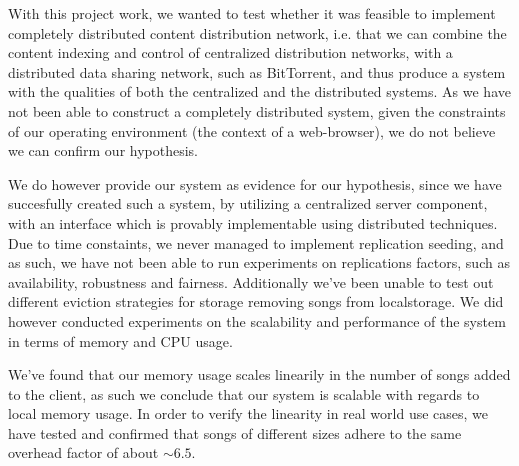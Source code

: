 With this project work, we wanted to test whether it was feasible to implement
completely distributed content distribution network, i.e. that we can combine
the content indexing and control of centralized distribution networks, with a
distributed data sharing network, such as BitTorrent, and thus produce a system
with the qualities of both the centralized and the distributed systems.
\newline\newline
As we have not been able to construct a completely distributed system, given
the constraints of our operating environment (the context of a web-browser), we
do not believe we can confirm our hypothesis.

We do however provide our system as evidence for our hypothesis, since we have
succesfully created such a system, by utilizing a centralized server component,
with an interface which is provably implementable using distributed techniques.
\newline\newline
Due to time constaints, we never managed to implement replication seeding, and
as such, we have not been able to run experiments on replications factors, such
as availability, robustness and fairness. Additionally we've been unable to
test out different eviction strategies for storage removing songs from
localstorage.
\newline\newline
We did however conducted experiments on the scalability and performance of the 
system in terms of memory and CPU usage.

We've found that our memory usage scales linearily in the number of songs added
to the client, as such we conclude that our system is scalable with regards to
local memory usage. In order to verify the linearity in real world use cases,
we have tested and confirmed that songs of different sizes adhere to the same
overhead factor of about $\sim6.5$.

